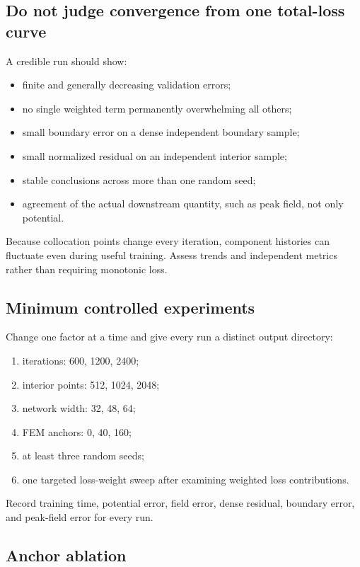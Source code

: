 \documentclass[11pt]{article}
\begin{document}
\subsection{Do not judge convergence from one total-loss curve}

A credible run should show:
\begin{itemize}[leftmargin=*]
  \item finite and generally decreasing validation errors;
  \item no single weighted term permanently overwhelming all others;
  \item small boundary error on a dense independent boundary sample;
  \item small normalized residual on an independent interior sample;
  \item stable conclusions across more than one random seed;
  \item agreement of the actual downstream quantity, such as peak field, not only potential.
\end{itemize}
Because collocation points change every iteration, component histories can fluctuate even during useful training. Assess trends and independent metrics rather than requiring monotonic loss.

\subsection{Minimum controlled experiments}

Change one factor at a time and give every run a distinct output directory:
\begin{enumerate}[leftmargin=*]
  \item iterations: 600, 1200, 2400;
  \item interior points: 512, 1024, 2048;
  \item network width: 32, 48, 64;
  \item FEM anchors: 0, 40, 160;
  \item at least three random seeds;
  \item one targeted loss-weight sweep after examining weighted loss contributions.
\end{enumerate}
Record training time, potential error, field error, dense residual, boundary error, and peak-field error for every run.

\subsection{Anchor ablation}
\end{document}
